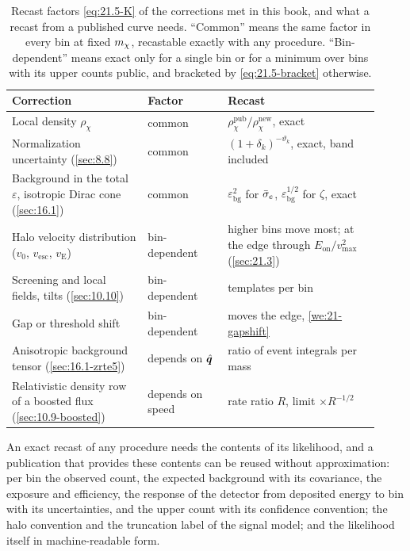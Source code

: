 \begin{table}[tbp]
  \caption{Recast factors \cref{eq:21.5-K} of the corrections met in this book, and what a recast from a published curve needs. ``Common'' means the same factor in every bin at fixed $m_{\chi}$, recastable exactly with any procedure. ``Bin-dependent'' means exact only for a single bin or for a minimum over bins with its upper counts public, and bracketed by \cref{eq:21.5-bracket} otherwise.}
  \label{tab:21-recast}
  \centering\small\setlength{\tabcolsep}{4pt}
  \begin{tabular}{@{}p{0.34\linewidth}p{0.20\linewidth}p{0.38\linewidth}@{}}
    \toprule
    Correction & Factor & Recast \\
    \midrule
    Local density $\rho_\chi$ & common & $\rho_\chi^{\mathrm{pub}}/\rho_\chi^{\mathrm{new}}$, exact \\
    Normalization uncertainty (\cref{sec:8.8}) & common & $(1 + \delta_k)^{-\vartheta_k}$, exact, band included \\
    Background in the total $\varepsilon$, isotropic Dirac cone (\cref{sec:16.1}) & common & $\varepsilon_{\mathrm{bg}}^2$ for $\bar{\sigma}_{e}$, $\varepsilon_{\mathrm{bg}}^{1/2}$ for $\zeta$, exact \\
    Halo velocity distribution ($v_0$, $v_{\mathrm{esc}}$, $v_{\mathrm{E}}$) & bin-dependent & higher bins move most; at the edge through $E_{\mathrm{on}}/v_{\mathrm{max}}^2$ (\cref{sec:21.3}) \\
    Screening and local fields, tilts (\cref{sec:10.10}) & bin-dependent & templates per bin \\
    Gap or threshold shift & bin-dependent & moves the edge, \cref{we:21-gapshift} \\
    Anisotropic background tensor (\cref{sec:16.1-zrte5}) & depends on $\hat{\bm{q}}$ & ratio of event integrals per mass \\
    Relativistic density row of a boosted flux (\cref{sec:10.9-boosted}) & depends on speed & rate ratio $R$, limit $\times R^{-1/2}$ \\
    \bottomrule
  \end{tabular}
\end{table}

An exact recast of any procedure needs the contents of its likelihood, and a publication that provides these contents can be reused without approximation: per bin the observed count, the expected background with its covariance, the exposure and efficiency, the response of the detector from deposited energy to bin with its uncertainties, and the upper count with its confidence convention; the halo convention and the truncation label of the signal model; and the likelihood itself in machine-readable form.
